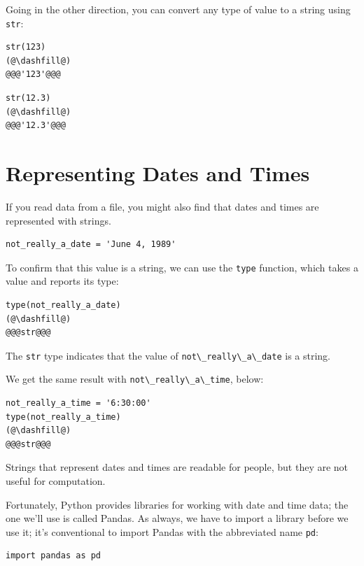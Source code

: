 Going in the other direction, you can convert any type of value to a
string using \passthrough{\lstinline!str!}:

\begin{lstlisting}[]
str(123)
(@\dashfill@)
@@@'123'@@@
\end{lstlisting}

\begin{lstlisting}[]
str(12.3)
(@\dashfill@)
@@@'12.3'@@@
\end{lstlisting}



\hypertarget{representing-dates-and-times}{%
\section{Representing Dates and
Times}\label{representing-dates-and-times}}

If you read data from a file, you might also find that dates and times
are represented with strings.

\begin{lstlisting}[]
not_really_a_date = 'June 4, 1989'
\end{lstlisting}

To confirm that this value is a string, we can use the
\passthrough{\lstinline!type!} function, which takes a value and reports
its type:

\begin{lstlisting}[]
type(not_really_a_date)
(@\dashfill@)
@@@str@@@
\end{lstlisting}
The \passthrough{\lstinline!str!} type indicates that the value of
\passthrough{\lstinline!not\_really\_a\_date!} is a string.

We get the same result with
\passthrough{\lstinline!not\_really\_a\_time!}, below:

\begin{lstlisting}[]
not_really_a_time = '6:30:00'
type(not_really_a_time)
(@\dashfill@)
@@@str@@@
\end{lstlisting}

Strings that represent dates and times are readable for people, but they
are not useful for computation.

Fortunately, Python provides libraries for working with date and time
data; the one we'll use is called Pandas. As always, we have to import a
library before we use it; it's conventional to import Pandas with the
abbreviated name \passthrough{\lstinline!pd!}:

\begin{lstlisting}[]
import pandas as pd
\end{lstlisting}

